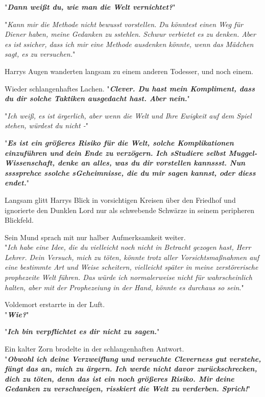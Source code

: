 {"\textbf{\emph{Dann weißt du, wie man die Welt vernichtet?}}"

"\emph{Kann mir die Methode nicht bewusst vorstellen. Du könntest einen Weg für Diener haben, meine Gedanken zu sstehlen. Schwur verbietet es zu denken. Aber es ist} \emph{ssicher, dass ich mir eine Methode ausdenken könnte, wenn das Mädchen sagt, es zu versuchen.}"

Harrys Augen wanderten langsam zu einem anderen Todesser, und noch einem.

Wieder schlangenhaftes Lachen. "\textbf{\emph{Clever. Du hast mein Kompliment, dass du dir solche Taktiken ausgedacht hast. Aber nein.}}"

"\emph{Ich weiß, es ist ärgerlich, aber wenn die Welt und Ihre Ewigkeit auf dem Spiel stehen, würdest du nicht -}"

"\textbf{\emph{Es ist ein größeres Risiko für die Welt, solche Komplikationen einzuführen und dein Ende zu verzögern. Ich sStudiere selbst Muggel-Wissenschaft, denke an alles, was du dir vorstellen kannssst. Nun ssssprehce ssolche sGeheimnisse, die du mir sagen kannst, oder diess endet.}}"

Langsam glitt Harrys Blick in vorsichtigen Kreisen über den Friedhof und ignorierte den Dunklen Lord nur als schwebende Schwärze in seinem peripheren Blickfeld.

Sein Mund sprach mit nur halber Aufmerksamkeit weiter.\\ "\emph{Ich habe eine Idee, die du vielleicht noch nicht in Betracht gezogen hast, Herr Lehrer. Dein Versuch, mich zu töten, könnte trotz aller Vorsichtsmaßnahmen auf eine bestimmte Art und Weise scheitern, vielleicht später in meine zerstörerische prophezeite Welt führen. Das würde ich normalerweise nicht für wahrscheinlich halten, aber mit der Prophezeiung in der Hand, könnte es durchaus so sein}."

Voldemort erstarrte in der Luft.\\ "\textbf{\emph{Wie?}}"

"\textbf{\emph{Ich bin verpflichtet es dir nicht zu sagen.}}"

Ein kalter Zorn brodelte in der schlangenhaften Antwort.\\ "\textbf{\emph{Obwohl ich deine Verzweiflung und versuchte Cleverness gut verstehe, fängt das an, mich zu ärgern. Ich werde nicht davor zurückschrecken, dich zu töten, denn das ist ein noch größeres Risiko. Mir deine Gedanken zu verschweigen, risskiert die Welt zu verderben. Sprich!}}"

}
